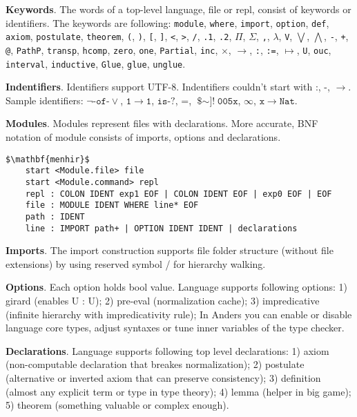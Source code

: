 \documentclass{article}
\theoremstyle{definition}
\begin{document}
\textbf{Keywords}. The words of a top-level language, file or repl, consist of keywords or identifiers.
The keywords are following: \texttt{module}, \texttt{where}, \texttt{import}, \texttt{option}, \texttt{def}, \texttt{axiom},
\texttt{postulate}, \texttt{theorem}, \texttt{(}, \texttt{)}, \texttt{[}, \texttt{]}, \texttt{<}, \texttt{>},
\texttt{/}, \texttt{.1}, \texttt{.2}, \texttt{$\Pi$}, \texttt{$\Sigma$}, \texttt{,}, \texttt{$\lambda$},
\texttt{V}, \texttt{$\bigvee$}, \texttt{$\bigwedge$}, \texttt{-}, \texttt{+}, \texttt{@}, \texttt{PathP},
\texttt{transp}, \texttt{hcomp}, \texttt{zero}, \texttt{one}, \texttt{Partial}, \texttt{inc},
\texttt{$\times$}, \texttt{$\rightarrow$}, \texttt{:}, \texttt{:=}, \texttt{$\mapsto$}, \texttt{U},
\texttt{ouc}, \texttt{interval}, \texttt{inductive}, \texttt{Glue}, \texttt{glue}, \texttt{unglue}.

\textbf{Indentifiers}. Identifiers support UTF-8. Indentifiers couldn't
start with $\texttt{:}$, $\texttt{-}$, $\rightarrow$. Sample identifiers:
$\neg\texttt{-of-}\vee$, $\texttt{1}$$\rightarrow$$\texttt{1}$, $\texttt{is-?}$,
$\texttt{=}$, $\texttt{\$$\sim$]!}$$\texttt{005x}$, $\infty$, $\texttt{x}$$\rightarrow$$\texttt{Nat}$.

\textbf{Modules}. Modules represent files with declarations. More accurate, BNF notation of module consists of imports, options and declarations.

\begin{lstlisting}[mathescape=true]
$\mathbf{menhir}$
    start <Module.file> file
    start <Module.command> repl
    repl : COLON IDENT exp1 EOF | COLON IDENT EOF | exp0 EOF | EOF
    file : MODULE IDENT WHERE line* EOF
    path : IDENT
    line : IMPORT path+ | OPTION IDENT IDENT | declarations
\end{lstlisting}

\textbf{Imports}. The import construction supports file folder structure (without file extensions)
by using reserved symbol / for hierarchy walking.

\textbf{Options}. Each option holds bool value. Language supports following options:
1) girard (enables U : U);
2) pre-eval (normalization cache);
3) impredicative (infinite hierarchy with impredicativity rule);
In Anders you can enable or disable language core types, adjust syntaxes or
tune inner variables of the type checker.

\textbf{Declarations}. Language supports following top level declarations:
1) axiom (non-computable declaration that breakes normalization);
2) postulate (alternative or inverted axiom that can preserve consistency);
3) definition (almost any explicit term or type in type theory);
4) lemma (helper in big game);
5) theorem (something valuable or complex enough).
\end{document}

